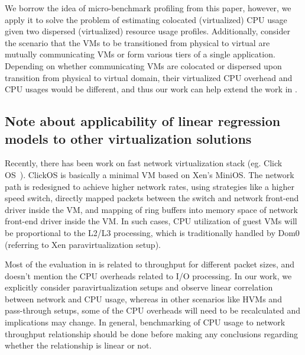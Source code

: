 
We borrow the idea of micro-benchmark profiling from this paper, however,
we apply it to solve the problem of estimating colocated (virtualized)
CPU usage given two dispersed (virtualized) resource usage profiles.
Additionally, consider the scenario that the VMs to be transitioned from 
physical to virtual are mutually
communicating VMs or form various tiers of a single application. 
Depending on whether communicating VMs are colocated or dispersed upon
transition from physical to virtual domain, their virtualized CPU overhead
and CPU usages would be different, and thus our work can help extend 
the work in \cite{profiling-and-modeling}.

\subsection{Note about applicability of linear regression models to other virtualization solutions}
Recently, there has been work on fast network virtualization 
stack (eg. Click OS~\cite{clickos}). 
ClickOS is basically a minimal VM based on Xen’s MiniOS. The network path is 
redesigned to achieve higher network rates, using strategies like a higher 
speed switch, directly mapped packets between the switch and network front-end 
driver inside the VM, and mapping of ring buffers into memory space of network 
front-end driver inside the VM. In such cases, CPU utilization of guest VMs 
will be proportional to the L2/L3 processing, which is traditionally handled 
by Dom0 (referring to Xen paravirtualization setup). 

Most of the evaluation in \cite{clickos} is related to throughput for 
different packet sizes, and doesn’t mention the CPU overheads related to 
I/O processing. In our work, we explicitly consider paravirtualization 
setups and observe linear correlation between network and CPU usage, whereas 
in other scenarios like HVMs and pass-through setups, some of the CPU 
overheads will need to be recalculated and implications may change. 
In general, benchmarking of CPU usage to network throughput relationship 
should be done before making any conclusions regarding whether the 
relationship is linear or not. 

